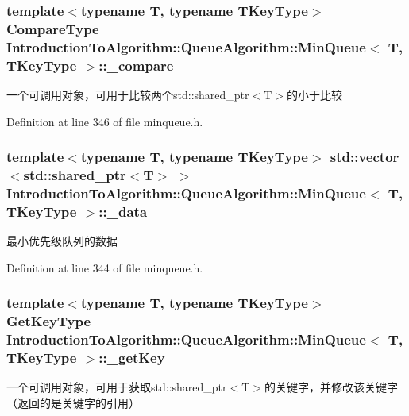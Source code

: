\subsubsection[{\+\_\+compare}]{\setlength{\rightskip}{0pt plus 5cm}template$<$typename T, typename T\+Key\+Type$>$ {\bf Compare\+Type} {\bf Introduction\+To\+Algorithm\+::\+Queue\+Algorithm\+::\+Min\+Queue}$<$ T, T\+Key\+Type $>$\+::\+\_\+compare\hspace{0.3cm}{\ttfamily [private]}}\label{class_introduction_to_algorithm_1_1_queue_algorithm_1_1_min_queue_a5de60762d317fc92c18e882dd50f8dfa}
一个可调用对象，可用于比较两个std\+::shared\+\_\+ptr$<$\+T$>$的小于比较 

Definition at line 346 of file minqueue.\+h.

\hypertarget{class_introduction_to_algorithm_1_1_queue_algorithm_1_1_min_queue_ad463395cef741624e6d078e4e4fc624f}{}
\subsubsection[{\+\_\+data}]{\setlength{\rightskip}{0pt plus 5cm}template$<$typename T, typename T\+Key\+Type$>$ std\+::vector$<$std\+::shared\+\_\+ptr$<$T$>$ $>$ {\bf Introduction\+To\+Algorithm\+::\+Queue\+Algorithm\+::\+Min\+Queue}$<$ T, T\+Key\+Type $>$\+::\+\_\+data\hspace{0.3cm}{\ttfamily [private]}}\label{class_introduction_to_algorithm_1_1_queue_algorithm_1_1_min_queue_ad463395cef741624e6d078e4e4fc624f}
最小优先级队列的数据 

Definition at line 344 of file minqueue.\+h.

\hypertarget{class_introduction_to_algorithm_1_1_queue_algorithm_1_1_min_queue_a3f791f9dd9d61dc2caf1d6b2b354f4c4}{}
\subsubsection[{\+\_\+get\+Key}]{\setlength{\rightskip}{0pt plus 5cm}template$<$typename T, typename T\+Key\+Type$>$ {\bf Get\+Key\+Type} {\bf Introduction\+To\+Algorithm\+::\+Queue\+Algorithm\+::\+Min\+Queue}$<$ T, T\+Key\+Type $>$\+::\+\_\+get\+Key\hspace{0.3cm}{\ttfamily [private]}}\label{class_introduction_to_algorithm_1_1_queue_algorithm_1_1_min_queue_a3f791f9dd9d61dc2caf1d6b2b354f4c4}
一个可调用对象，可用于获取std\+::shared\+\_\+ptr$<$\+T$>$的关键字，并修改该关键字（返回的是关键字的引用） 

